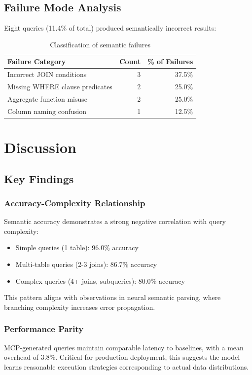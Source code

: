 \documentclass[11pt,a4paper]{article}
\begin{document}
\subsection{Failure Mode Analysis}

Eight queries (11.4\% of total) produced semantically incorrect results:

\begin{table}[h]
\centering
\begin{tabular}{lrr}
\toprule
\textbf{Failure Category} & \textbf{Count} & \textbf{\% of Failures} \\
\midrule
Incorrect JOIN conditions & 3 & 37.5\% \\
Missing WHERE clause predicates & 2 & 25.0\% \\
Aggregate function misuse & 2 & 25.0\% \\
Column naming confusion & 1 & 12.5\% \\
\bottomrule
\end{tabular}
\caption{Classification of semantic failures}
\label{tab:failures}
\end{table}

\section{Discussion}

\subsection{Key Findings}

\subsubsection{Accuracy-Complexity Relationship}
Semantic accuracy demonstrates a strong negative correlation with query complexity:
\begin{itemize}
    \item Simple queries (1 table): 96.0\% accuracy
    \item Multi-table queries (2-3 joins): 86.7\% accuracy
    \item Complex queries (4+ joins, subqueries): 80.0\% accuracy
\end{itemize}

This pattern aligns with observations in neural semantic parsing, where branching complexity increases error propagation.

\subsubsection{Performance Parity}
MCP-generated queries maintain comparable latency to baselines, with a mean overhead of 3.8\%. Critical for production deployment, this suggests the model learns reasonable execution strategies corresponding to actual data distributions.
\end{document}
